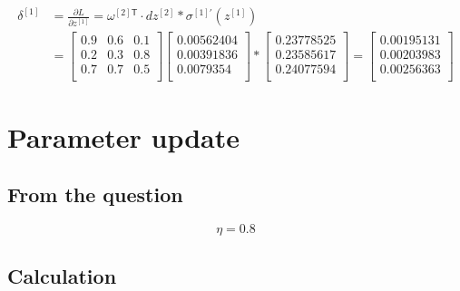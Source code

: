 \documentclass{article}
\begin{document}
\[
    \begin{aligned}
        \delta^{[1]} & = \frac{\partial L}{\partial z^{[1]}} = \omega^{[2]\mathsf{T}}\cdot dz^{[2]}*\sigma^{[1]'}(z^{[1]}) \\
                     & = \begin{bmatrix}
                             0.9 & 0.6 & 0.1 \\
                             0.2 & 0.3 & 0.8 \\
                             0.7 & 0.7 & 0.5 \\
                         \end{bmatrix}
        \begin{bmatrix}
            0.00562404 \\
            0.00391836 \\
            0.0079354  \\
        \end{bmatrix}
        * \begin{bmatrix}
              0.23778525 \\
              0.23585617 \\
              0.24077594 \\
          \end{bmatrix}
        = \begin{bmatrix}
              0.00195131 \\
              0.00203983 \\
              0.00256363 \\
          \end{bmatrix}
    \end{aligned}
\]

\section{Parameter update}

\subsection{From the question}

\[
    \eta = 0.8
\]

\subsection{Calculation}
\end{document}
